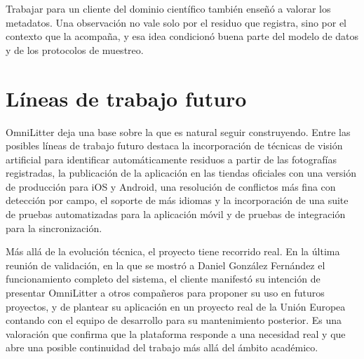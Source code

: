 Trabajar para un cliente del dominio científico también enseñó a valorar los metadatos.
Una observación no vale solo por el residuo que registra, sino por el contexto que la
acompaña, y esa idea condicionó buena parte del modelo de datos y de los protocolos de
muestreo.

\section{Líneas de trabajo futuro}

OmniLitter deja una base sobre la que es natural seguir construyendo. 
Entre las posibles líneas de trabajo futuro destaca la incorporación de técnicas
de visión artificial para identificar automáticamente residuos a partir de las
fotografías registradas, la publicación de la aplicación en las
tiendas oficiales con una versión de producción para iOS y Android, una resolución de
conflictos más fina con detección por campo, el soporte de más idiomas y la
incorporación de una suite de pruebas automatizadas para la aplicación móvil y de
pruebas de integración para la sincronización.

Más allá de la evolución técnica, el proyecto tiene recorrido real. En la última
reunión de validación, en la que se mostró a Daniel González Fernández el
funcionamiento completo del sistema, el cliente manifestó su intención de
presentar OmniLitter a otros compañeros
para proponer su uso en futuros proyectos, y de plantear su aplicación en un proyecto
real de la Unión Europea contando con el equipo de desarrollo para su mantenimiento
posterior. Es una valoración que confirma que la plataforma responde a una necesidad
real y que abre una posible continuidad del trabajo más allá del ámbito académico.

